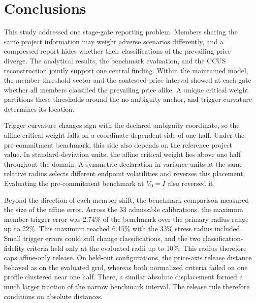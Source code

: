 \section{Conclusions}

This study addressed one stage-gate reporting problem. Members sharing the same project information may weight adverse scenarios differently, and a compressed report hides whether their classifications of the prevailing price diverge. The analytical results, the benchmark evaluation, and the CCUS reconstruction jointly support one central finding. Within the maintained model, the member-threshold vector and the contested-price interval showed at each gate whether all members classified the prevailing price alike. A unique critical weight partitions these thresholds around the no-ambiguity anchor, and trigger curvature determines its location.

Trigger curvature changes sign with the declared ambiguity coordinate, so the affine critical weight falls on a coordinate-dependent side of one half. Under the pre-commitment benchmark, this side also depends on the reference project value. In standard-deviation units, the affine critical weight lies above one half throughout the domain. A symmetric declaration in variance units at the same relative radius selects different endpoint volatilities and reverses this placement. Evaluating the pre-commitment benchmark at $V_0=I$ also reversed it.

Beyond the direction of each member shift, the benchmark comparison measured the size of the affine error. Across the 33 admissible calibrations, the maximum member-trigger error was 2.74\% of the benchmark over the primary radius range up to 22\%. This maximum reached 6.15\% with the 33\% stress radius included. Small trigger errors could still change classifications, and the two classification-fidelity criteria held only at the evaluated radii up to 10\%. This radius therefore caps affine-only release. On held-out configurations, the price-axis release distance behaved as on the evaluated grid, whereas both normalized criteria failed on one profile clustered near one half. There, a similar absolute displacement formed a much larger fraction of the narrow benchmark interval. The release rule therefore conditions on absolute distances.

